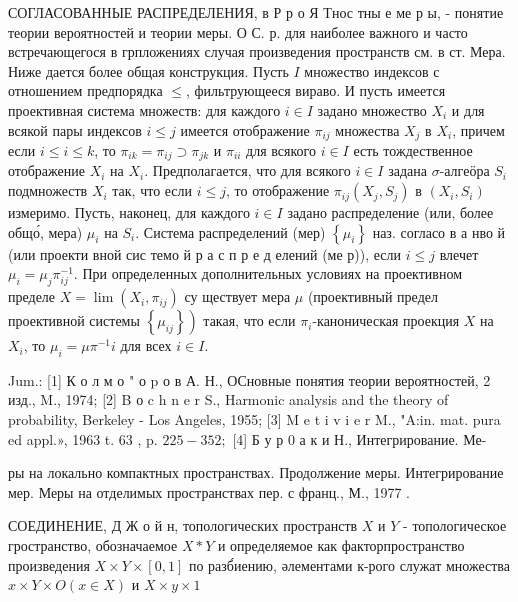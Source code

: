 \documentclass[10pt]{article}
\begin{document}
СОГЛАСОВАННЫЕ РАСПРЕДЕЛЕНИЯ, в Р р о Я Тнос тны е ме р ы, - понятие теории вероятностей и теории меры. О С. р. для наиболее важного и часто встречающегося в грпложениях случая произведения пространств см. в ст. Мера. Ниже дается более общая конструкция. Пусть $I$ множество индексов с отношением предпорядка $\leqslant$, фильтрующееся вираво. И пусть имеется проективная система множеств: для каждого $i \in I$ задано множество $X_{i}$ и для всякой пары индексов $i \leqslant j$ имеется отображение $\pi_{i j}$ множества $X_{j}$ в $X_{i}$, причем если $i \leqslant i \leqslant k$, то $\pi_{i k}=\pi_{i j} \supset \pi_{j k}$ и $\pi_{i i}$ для всякого $i \in I$ есть тождественное отображение $X_{i}$ на $X_{i}$. Предполагается, что для всякого $i \in I$ задана $\sigma$-алгеӧра $S_{i}$ подмножеств $X_{i}$ так, что если $i \leqslant j$, то отображение $\pi_{i j}\left(X_{j}, S_{j}\right)$ в $\left(X_{i}, S_{i}\right)$ измеримо. Пусть, наконец, для каждого $i \in I$ задано распределение (или, более общо́, мера) $\mu_{i}$ на $S_{i}$. Система распределений (мер) $\left\{\mu_{i}\right\}$ наз. согласо в а нво й (или проекти вной сис темо й р а с п р е д елений (ме р)), если $i \leqslant j$ влечет $\mu_{i}=\mu_{j} \pi_{i j}^{-1}$. При определенных дополнительных условиях на проективном пределе $X=\lim \left(X_{i}, \pi_{i j}\right)$ су ществует мера $\mu$ (проективный предел проективной системы $\left.\left\{\mu_{i j}\right\}\right)$ такая, что если $\pi_{i}$-каноническая проекция $X$ на $X_{i}$, то $\mu_{i}=\mu \pi^{-1} i$ для всех $i \in I$.



Jum.: [1] К о л м о " о $\mathrm{p}$ о в А. Н., ОСновные понятия теории вероятностей, 2 изд., M., 1974; [2] B о c h n e r S., Harmonic analysis and the theory of probability, Berkeley - Los Angeles, 1955; [3] M e t i v i e r M., "A:in. mat. pura ed appl.», 1963 t. 63 , p. $225-352 ;$ [4] Б у р 0 а к и Н., Интегрирование. Ме-

ры на локально компактных пространствах. Продолжение меры. Интегрирование мер. Меры на отделимых пространствах пер. с франц., М., 1977 .



СОЕДИНЕНИЕ, Д Ж о й н, топологических пространств $X$ и $Y$ - топологическое гространство, обозначаемое $X * Y$ и определяемое как факторпространство произведения $X \times Y \times[0,1]$ по разб́иению, әлементами к-рого служат множества $x \times Y \times O(x \in X)$ и $X \times y \times 1$
\end{document}
